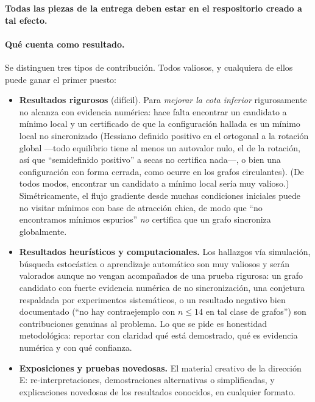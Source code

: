 \documentclass[11pt,a4paper]{article}
\begin{document}
\textbf{Todas las piezas de la entrega deben estar en el respositorio creado a tal efecto.}

\paragraph{Qué cuenta como resultado.}
Se distinguen tres tipos de contribución. Todos valiosos, y cualquiera de ellos puede ganar el primer puesto:
\begin{itemize}
    \item \textbf{Resultados rigurosos} (difícil). Para \emph{mejorar la cota inferior} rigurosamente no alcanza con evidencia numérica: hace falta encontrar un candidato a mínimo local y un certificado de que la configuración hallada es un mínimo local no sincronizado (Hessiano definido positivo en el ortogonal a la rotación global ---todo equilibrio tiene al menos un autovalor nulo, el de la rotación, así que ``semidefinido positivo'' a secas no certifica nada---, o bien una configuración con forma cerrada, como ocurre en los grafos circulantes). (De todos modos, encontrar un candidato a mínimo local sería muy valioso.) Simétricamente, el flujo gradiente desde muchas condiciones iniciales puede no visitar mínimos con base de atracción chica, de modo que ``no encontramos mínimos espurios'' \emph{no} certifica que un grafo sincroniza globalmente.
    \item \textbf{Resultados heurísticos y computacionales.} Los hallazgos vía simulación, búsqueda estocástica o aprendizaje automático son muy valiosos y serán valorados aunque no vengan acompañados de una prueba rigurosa: un grafo candidato con fuerte evidencia numérica de no sincronización, una conjetura respaldada por experimentos sistemáticos, o un resultado negativo bien documentado (``no hay contraejemplo con $n\le 14$ en tal clase de grafos'') son contribuciones genuinas al problema. Lo que se pide es honestidad metodológica: reportar con claridad qué está demostrado, qué es evidencia numérica y con qué confianza.
    \item \textbf{Exposiciones y pruebas novedosas.} El material creativo de la dirección E: re-interpretaciones, demostraciones alternativas o simplificadas, y explicaciones novedosas de los resultados conocidos, en cualquier formato.
\end{itemize}
\end{document}
